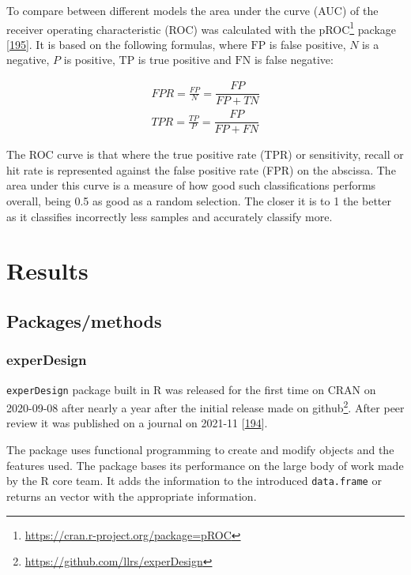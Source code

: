 \documentclass[
  a4paper,
]{book}
\DeclareRobustCommand{\href}[2]{#2\footnote{\url{#1}}}
\begin{document}
To compare between different models the area under the curve (AUC) of the receiver operating characteristic (ROC) was calculated with the \href{https://cran.r-project.org/package=pROC}{pROC} package {[}\protect\hyperlink{ref-robin2011}{195}{]}.
It is based on the following formulas, where \(\text{FP}\) is false positive, \(N\) is a negative, \(P\) is positive, \(\text{TP}\) is true positive and \(\text{FN}\) is false negative:

\[
\begin{aligned}
FPR = \frac{FP}{N} = \dfrac{FP}{FP+TN} \\
TPR = \frac{TP}{P} = \dfrac{FP}{FP+FN} 
\end{aligned}
\]

The ROC curve is that where the true positive rate (TPR) or sensitivity, recall or hit rate is represented against the false positive rate (FPR) on the abscissa.
The area under this curve is a measure of how good such classifications performs overall, being 0.5 as good as a random selection.
The closer it is to 1 the better as it classifies incorrectly less samples and accurately classify more.

\hypertarget{results}{%
\chapter{Results}\label{results}}

\hypertarget{packagesmethods}{%
\section{Packages/methods}\label{packagesmethods}}

\hypertarget{experdesign-1}{%
\subsection{experDesign}\label{experdesign-1}}

\texttt{experDesign} package built in R was released for the first time on CRAN on 2020-09-08 after nearly a year after the initial release made on \href{https://github.com/llrs/experDesign}{github}.
After peer review it was published on a journal on 2021-11 {[}\protect\hyperlink{ref-revillasancho2021}{194}{]}.

The package uses functional programming to create and modify objects and the features used.
The package bases its performance on the large body of work made by the R core team.
It adds the information to the introduced \texttt{data.frame} or returns an vector with the appropriate information.
\end{document}
